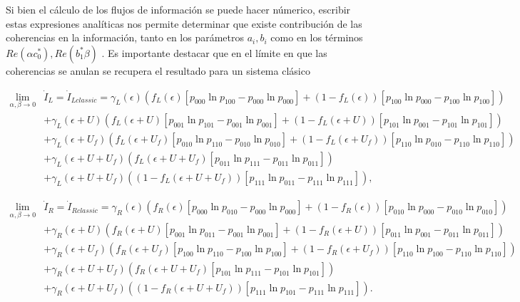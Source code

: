 \begin{appendixs}
Si bien el cálculo de los flujos de información se puede hacer númerico, escribir estas expresiones analíticas nos permite determinar que existe contribución de las coherencias en la información, tanto en los parámetros $a_{i},b_{i}$ como en los términos $Re(\alpha c^{*}_{0}),Re(b^{*}_{1} \beta)$ . Es importante destacar que en el  límite en que las coherencias se anulan se recupera el resultado para un sistema clásico

\begin{align*}
 \lim_{\alpha,\beta \to 0}  & \dot{I}_{L}  = \dot{I}_{Lclassic}   =  \gamma_{L}(\epsilon)(f_{L}(\epsilon)[p_{000}\ln p_{100} - p_{000}\ln p_{000}] + (1-f_{L}(\epsilon))[p_{100}\ln p_{000} - p_{100}\ln p_{100} ] )  \\ 
      & + \gamma_{L}(\epsilon + U)(f_{L}(\epsilon + U)[p_{001}\ln p_{101} - p_{001}\ln p_{001}] + (1-f_{L}(\epsilon + U))[p_{101}\ln p_{001} -p_{101}\ln p_{101} ]   ) \\  
      & + \gamma_{L}(\epsilon + U_{f})( f_{L}(\epsilon + U_{f})[p_{010}\ln p_{110} -p_{010}\ln p_{010} ]  + (1-f_{L}(\epsilon + U_{f}))[p_{110}\ln p_{010} - p_{110}\ln p_{110} ] ) \\  
      & + \gamma_{L}(\epsilon + U + U_{f})( f_{L}(\epsilon + U + U_{f})[p_{011}\ln p_{111}- p_{011}\ln p_{011}]) \\   
      & + \gamma_{L}(\epsilon + U + U_{f})( (1-f_{L}(\epsilon+U+U_{f}) )[p_{111}\ln p_{011} - p_{111}\ln p_{111}]),   
\end{align*}

\begin{align*}
 \lim_{\alpha,\beta \to 0}  & \dot{I}_{R}  = \dot{I}_{Rclassic}   =  \gamma_{R}(\epsilon)(f_{R}(\epsilon)[p_{000}\ln p_{010} - p_{000}\ln p_{000}] + (1-f_{R}(\epsilon))[p_{010}\ln p_{000} - p_{010}\ln p_{010} ] )  \\ 
      & + \gamma_{R}(\epsilon + U)(f_{R}(\epsilon + U)[p_{001}\ln p_{011} - p_{001}\ln p_{001}] + (1-f_{R}(\epsilon + U))[p_{011}\ln p_{001} -p_{011}\ln p_{011} ]   ) \\  
      & + \gamma_{R}(\epsilon + U_{f})( f_{R}(\epsilon + U_{f})[p_{100}\ln p_{110} -p_{100}\ln p_{100} ]  + (1-f_{R}(\epsilon + U_{f}))[p_{110}\ln p_{100} - p_{110}\ln p_{110} ] ) \\  
      & + \gamma_{R}(\epsilon + U + U_{f})( f_{R}(\epsilon + U + U_{f})[p_{101}\ln p_{111}- p_{101}\ln p_{101}]) \\   
      & + \gamma_{R}(\epsilon + U + U_{f})( (1-f_{R}(\epsilon+U+U_{f}) )[p_{111}\ln p_{101} - p_{111}\ln p_{111}]).   
\end{align*}


\end{appendixs}